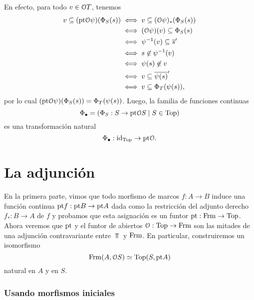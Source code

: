 En efecto, para todo $v\in\cal OT$, tenemos
\begin{align*}
    v\subseteq (\pt\cal O\psi)(\Phi_S(s))
    &\iff v\subseteq (\cal O\psi)_*(\Phi_S(s)) \\
    &\iff (\cal O\psi)(v) \subseteq \Phi_S(s) \\
    &\iff \psi^{-1}(v) \subseteq \ol{s}' \\
    &\iff s\nin \psi^{-1}(v) \\
    &\iff \psi(s)\nin v \\
    &\iff v\subseteq \ol{\psi(s)}' \\
    &\iff v\subseteq \Phi_T(\psi(s)),
\end{align*}
por lo cual $(\pt\cal O\psi)(\Phi_S(s))=\Phi_T(\psi(s))$.
Luego, la familia de funciones continuas
\[
    \Phi_\bullet=(\Phi_S:S\to\pt\cal OS\mid S\in \Top)
\]
es una transformación natural
\[
    \Phi_\bullet : \id_\Top\to\pt\cal O
.\]

\section{La adjunción}
    \label{ssec:adjuncion}

En la primera parte, vimos que todo morfismo de marcos
$f:A\to B$ induce una función continua $\pt f:\pt B\to\pt A$ dada
como la restricción del adjunto derecho $f_*:B\to A$ de $f$ y
probamos que esta asignación es un funtor $\pt:\Frm\to\Top$.
Ahora veremos que $\pt$ y el funtor de abiertos
$\cal O:\Top\to\Frm$ son las mitades de una adjunción contravariante
entre $\Top$ y $\Frm$. En particular, construiremos un isomorfismo
\begin{equation}
    \label{eqn:adj_frm_top}
    \Frm(A,\cal OS) \simeq \Top(S,\pt A)
\end{equation}
natural en $A$ y en $S$.

\iffalse
\subsubsection{Usando morfismos iniciales}

